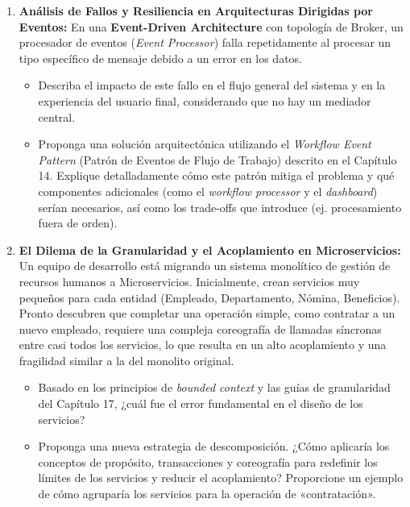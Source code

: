 \documentclass[12pt,a4paper]{article}
\begin{document}
\begin{enumerate}[label=\textbf{\arabic*.}, leftmargin=*, itemsep=1.2em]
  \item \textbf{Análisis de Fallos y Resiliencia en Arquitecturas Dirigidas por Eventos:}
  En una \textbf{Event-Driven Architecture} con topología de Broker, un procesador de eventos (\emph{Event Processor}) falla repetidamente al procesar un tipo específico de mensaje debido a un error en los datos.
  \begin{itemize}[leftmargin=1.5em]
    \item Describa el impacto de este fallo en el flujo general del sistema y en la experiencia del usuario final, considerando que no hay un mediador central.
    \item Proponga una solución arquitectónica utilizando el \emph{Workflow Event Pattern} (Patrón de Eventos de Flujo de Trabajo) descrito en el Capítulo 14. Explique detalladamente cómo este patrón mitiga el problema y qué componentes adicionales (como el \emph{workflow processor} y el \emph{dashboard}) serían necesarios, así como los trade-offs que introduce (ej. procesamiento fuera de orden).
  \end{itemize}

  \item \textbf{El Dilema de la Granularidad y el Acoplamiento en Microservicios:}
  Un equipo de desarrollo está migrando un sistema monolítico de gestión de recursos humanos a Microservicios. Inicialmente, crean servicios muy pequeños para cada entidad (Empleado, Departamento, Nómina, Beneficios). Pronto descubren que completar una operación simple, como contratar a un nuevo empleado, requiere una compleja coreografía de llamadas síncronas entre casi todos los servicios, lo que resulta en un alto acoplamiento y una fragilidad similar a la del monolito original.
  \begin{itemize}[leftmargin=1.5em]
    \item Basado en los principios de \emph{bounded context} y las guías de granularidad del Capítulo 17, ¿cuál fue el error fundamental en el diseño de los servicios?
    \item Proponga una nueva estrategia de descomposición. ¿Cómo aplicaría los conceptos de propósito, transacciones y coreografía para redefinir los límites de los servicios y reducir el acoplamiento? Proporcione un ejemplo de cómo agruparía los servicios para la operación de «contratación».
  \end{itemize}


\end{enumerate}
\end{document}
